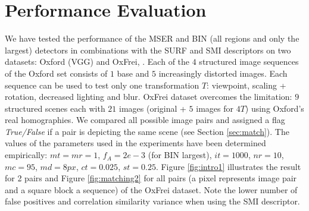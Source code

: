 \documentclass[a4paper,11pt]{article}
\begin{document}
\section{Performance Evaluation}

We have tested the performance of the MSER and BIN (all regions and only the largest) detectors in combinations with the SURF and SMI descriptors on two datasets: Oxford (VGG) \cite{Mikolajczyk:2005} and OxFrei, \cite{Ranguelova2016AICCSA}. Each of the $4$ structured image sequences of the Oxford set consists of $1$ base and $5$ increasingly distorted images. Each sequence can be used to test only one transformation $T$: viewpoint, scaling + rotation, decreased lighting and blur. OxFrei dataset overcomes the limitation: $9$ structured scenes each with $21$ images (original + $5$ images for $4 T$) using Oxford's real homographies. We compared all possible image pairs and assigned a flag {\em True/False} if a pair is depicting the same scene (see Section \ref{sec:match}). The values of the parameters used in the experiments have been determined empirically: $\mathit{mt}=\mathit{mr}=1$, $f_A=2e-3$ (for BIN largest), $\mathit{it}=1000$, $\mathit{nr}=10$, $\mathit{mc}=95$, $\mathit{md}=8px$, $\mathit{ct}=0.025$, $\mathit{st}=0.25$. Figure \ref{fig:intro1} illustrates the result for 2 pairs and Figure \ref{fig:matching2} for all pairs (a pixel represents image pair and a square block a sequence) of the OxFrei dataset. Note the lower number of false positives and correlation similarity variance when using the SMI descriptor.
\end{document}
